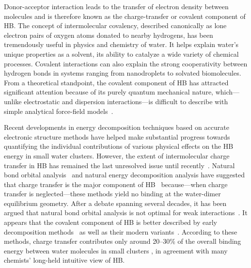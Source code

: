 \documentclass[journal=jacsat,manuscript=article]{achemso}
\begin{document}
Donor-acceptor interaction leads to the transfer of electron density between molecules and is therefore known as the charge-transfer or covalent component of HB. 
The concept of intermolecular covalency, described canonically as lone electron pairs of oxygen atoms donated to nearby hydrogens, has been tremendously useful in physics and chemistry of water.
It helps explain water's unique properties as a solvent, its ability to catalyze a wide variety of chemical processes. Covalent interactions can also explain the strong cooperativity between hydrogen bonds in systems ranging from nanodroplets to solvated biomolecules. 
From a theoretical standpoint, the covalent component of HB has attracted significant attention because of its purely quantum mechanical nature, which---unlike electrostatic and dispersion interactions---is difficult to describe with simple analytical force-field models~\cite{lee2011effects, gordon2013accurate}.

Recent developments in energy decomposition techniques based on accurate electronic structure methods have helped make substantial progress towards quantifying the individual contributions of various physical effects on the HB energy in small water clusters. 
However, the extent of intermolecular charge transfer in HB has remained the last unresolved issue until recently~\cite{isaacs1999covalency,ghanty2000hydrogen,stone2017natural}. 
Natural bond orbital analysis~\cite{weinhold1998natural} and natural energy decomposition analysis \cite{glendening1994natural} have suggested that charge transfer is the major component of HB~\cite{schenter1996natural,glendening2005natural,weinhold2005resonance} because---when charge transfer is neglected---these methods yield no binding at the water-dimer equilibrium geometry. 
After a debate spanning several decades, it has been argued that natural bond orbital analysis is not optimal for weak interactions~\cite{stone2017natural}.
It appears that the covalent component of HB is better described by early decomposition methods~\cite{kitaura1976new,bagus1984new,bagus1992decomposition,stevens1987frozen,chen1996energy,stone1993computation} as well as their modern variants~\cite{mo2000energy,misquitta2013charge,khaliullin2007unravelling,misquitta2013charge}. 
According to these methods, charge transfer contributes only around 20--30\% of the overall binding energy between water molecules in small clusters \cite{stevens1987frozen,stone1993computation,chen1996energy,piquemal2005csov,khaliullin2009electron,cobar2012examination}, in agreement with many chemists' long-held intuitive view of HB.
\end{document}
